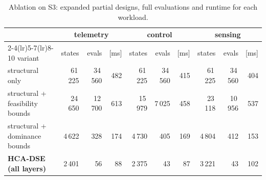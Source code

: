 \documentclass[pdflatex,sn-nature]{sn-jnl}
\theoremstyle{thmstyleone}
\theoremstyle{thmstyletwo}
\theoremstyle{thmstylethree}
\begin{document}
\begin{table}[!htbp]\centering
\caption{Ablation on S3: expanded partial designs, full evaluations and runtime for each
workload.}\label{tabS6}
{\let\scriptsize\tiny\setlength{\tabcolsep}{2pt}\scriptsize
\setlength{\tabcolsep}{3.5pt}
\begin{tabular}{lrrrrrrrrr}
\toprule
& \multicolumn{3}{c}{telemetry} & \multicolumn{3}{c}{control} & \multicolumn{3}{c}{sensing} \\
\cmidrule(lr){2-4}\cmidrule(lr){5-7}\cmidrule(lr){8-10}
variant & states & evals & [ms] & states & evals & [ms] & states & evals & [ms] \\
\midrule
structural only & 61\,225 & 34\,560 & 482 & 61\,225 & 34\,560 & 415 & 61\,225 & 34\,560 & 404 \\
structural + feasibility bounds & 24\,650 & 12\,700 & 613 & 15\,979 & 7\,025 & 458 & 23\,118 & 10\,956 & 537 \\
structural + dominance bounds & 4\,622 & 328 & 174 & 4\,730 & 405 & 169 & 4\,804 & 412 & 153 \\
\textbf{HCA-DSE (all layers)} & 2\,401 & 56 & 88 & 2\,375 & 43 & 87 & 3\,221 & 43 & 102 \\
\bottomrule
\end{tabular}}
\end{table}
\end{document}

